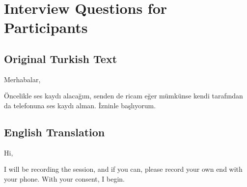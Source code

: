 \chapter{Interview Questions for Participants}
\label{chp:Interview Questions}

\section{Original Turkish Text}
Merhabalar, 

Öncelikle ses kaydı alacağım, senden de ricam eğer mümkünse kendi tarafından da telefonuna ses kaydı alman. İzninle başlıyorum. 

\section{English Translation}
Hi, 

I will be recording the session, and if you can, please record your own end with your phone. With your consent, I begin.

